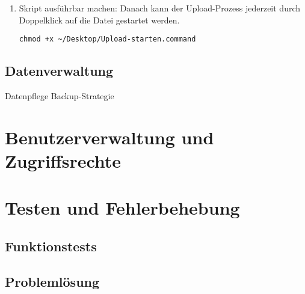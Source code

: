 \documentclass[12pt,a4paper]{report}
\begin{document}
\begin{enumerate}
    \item Skript ausführbar machen:
    Danach kann der Upload-Prozess jederzeit durch Doppelklick auf die Datei gestartet werden.

    \begin{verbatim}
chmod +x ~/Desktop/Upload-starten.command
    \end{verbatim}
  \end{enumerate}

  \subsection{Datenverwaltung}
    Datenpflege
    Backup-Strategie

\section{Benutzerverwaltung und Zugriffsrechte}
\section{Testen und Fehlerbehebung}
  \subsection{Funktionstests}
  \subsection{Problemlösung}
\end{document}
